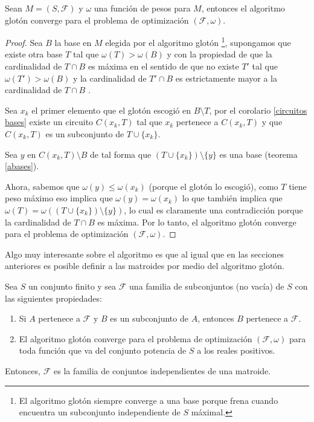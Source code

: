 \begin{teo} \label{glot}
Sean $M=(S,\mathcal{F})$ y $\omega$ una función de pesos para $M$, entonces el algoritmo glotón converge para el problema de optimización $(\mathcal{F}, \omega)$. 
\end{teo}
\begin{proof}
Sea $B$ la base en $M$ elegida por el algoritmo glotón \footnote{El algoritmo glotón siempre converge a una base porque frena cuando encuentra un subconjunto independiente de $S$ máximal.}, supongamos que existe otra base $T$ tal que $\omega(T)> \omega(B)$ y con la propiedad de que la cardinalidad de $T\cap B$ es máxima en el sentido de que no existe $T'$ tal que $\omega(T')> \omega(B)$ y la cardinalidad de $T'\cap B$ es estrictamente mayor a la cardinalidad de $T\cap B$ . 

Sea $x_k$ el primer elemento que el glotón escogió en $B \setminus T$, por el corolario \ref{circuitos bases} existe un circuito $C(x_k,T)$ tal que $x_k$ pertenece a $C(x_k,T)$ y que $C(x_k,T)$ es un subconjunto de $T \cup \{x_k\}$. 

Sea $y$ en $C(x_k,T) \setminus B$ de tal forma que $(T \cup \{x_k\}) \setminus \{y\}$ es una base (teorema \ref{abases}). 
 
Ahora, sabemos que $\omega(y)\leq \omega(x_k)$ (porque el glotón lo escogió), como $T$ tiene peso máximo eso implica que $\omega(y)=\omega(x_k)$ lo que también implica que $\omega(T)=\omega((T \cup \{x_k\}) \setminus \{y\})$, lo cual es claramente una contradicción porque la cardinalidad de $T\cap B$ es máxima. Por lo tanto, el algoritmo glotón converge para el problema de optimización $(\mathcal{F}, \omega)$.
\end{proof}

Algo muy interesante sobre el algoritmo es que al igual que en las secciones anteriores es posible definir a las matroides por medio del algoritmo glotón. 

\begin{teo} \label{axiomas gloton}
Sea $S$ un conjunto finito y sea $\mathcal{F}$ una familia de subconjuntos (no vacía) de $S$ con las siguientes propiedades:
\begin{enumerate}
\item Si $A$ pertenece a $\mathcal{F}$ y $B$ es un subconjunto de $A$, entonces $B$ pertenece a $\mathcal{F}$.
\item El algoritmo glotón converge para el problema de optimización $(\mathcal{F},\omega)$ para toda función que va del conjunto potencia de $S$ a los reales positivos.
\end{enumerate}
Entonces, $\mathcal{F}$ es la familia de conjuntos independientes de una matroide. 
\end{teo}

